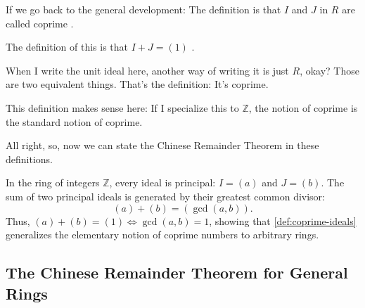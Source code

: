 \begin{speech}[01:16:29 - 01:17:39]
If we go back to the general development: The definition is that $I$ and $J$ in $R$ are called coprime .

The definition of this is that $I + J = (1)$ .

When I write the unit ideal here, another way of writing it is just $R$, okay?  Those are two equivalent things. That's the definition: It's coprime.

This definition makes sense here: If I specialize this to $\mathbb{Z}$, the notion of coprime is the standard notion of coprime.

All right, so, now we can state the Chinese Remainder Theorem in these definitions.
\end{speech}

\begin{content}

\begin{steps}
In the ring of integers $\mathbb{Z}$, every ideal is principal: $I = (a)$ and $J = (b)$.
The sum of two principal ideals is generated by their greatest common divisor:
\[
(a) + (b) = (\gcd(a, b)).
\]
Thus, $(a) + (b) = (1) \iff \gcd(a, b) = 1$, showing that \cref{def:coprime-ideals} generalizes the elementary notion of coprime numbers to arbitrary rings.
\end{steps}
\end{content}

\subsection{The Chinese Remainder Theorem for General Rings}

